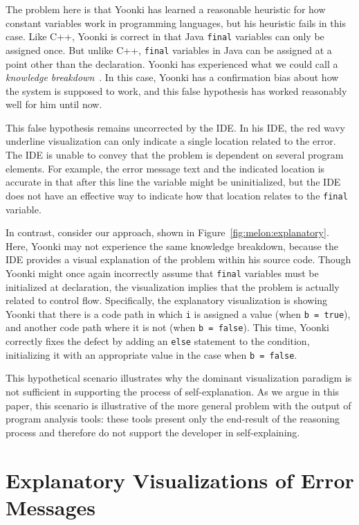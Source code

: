 \documentclass[conference]{IEEEtran}
\begin{document}
The problem here is that Yoonki has learned a reasonable heuristic for how constant variables work in programming languages, but his heuristic fails in this case. Like C++, Yoonki is correct in that Java \texttt{final} variables can only be assigned once. But unlike C++, \texttt{final} variables in Java can be assigned at a point other than the declaration. Yoonki has experienced what we could call a \textit{knowledge breakdown}~\cite{Ko2005}. In this case, Yoonki has a confirmation bias about how the system is supposed to work, and this false hypothesis has worked reasonably well for him until now.

This false hypothesis remains uncorrected by the IDE. In his IDE, the red wavy underline visualization can only indicate a single location related to the error. The IDE is unable to convey that the problem is dependent on several program elements. For example, the error message text and the indicated location is accurate in that after this line the variable might be uninitialized, but the IDE does not have an effective way to indicate how that location relates to the \texttt{final} variable.

In contrast, consider our approach, shown in Figure~\ref{fig:melon:explanatory}. Here, Yoonki may not experience the same knowledge breakdown, because the IDE provides a visual explanation of the problem within his source code. Though Yoonki might once again incorrectly assume that \texttt{final} variables must be initialized at declaration, the visualization implies that the problem is actually related to control flow. Specifically, the explanatory visualization is showing Yoonki that there is a code path in which \texttt{i} is assigned a value (when \texttt{b = true}), and another code path where it is not (when \texttt{b = false}). This time, Yoonki correctly fixes the defect by adding an \texttt{else} statement to the condition, initializing it with an appropriate value in the case when \texttt{b = false}.

This hypothetical scenario illustrates why the dominant visualization paradigm is not sufficient in supporting the process of self-explanation. As we argue in this paper, this scenario is illustrative of the more general problem with the output of program analysis tools: these tools present only the end-result of the reasoning process and therefore do not support the developer in self-explaining.

\section{Explanatory Visualizations of Error Messages}
\label{sec:motivation}
\end{document}
